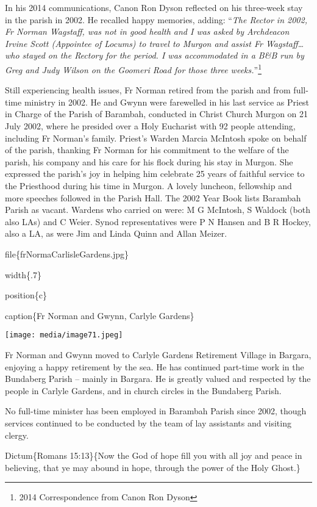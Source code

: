 In his 2014 communications, Canon Ron Dyson reflected on his three-week stay in the parish in 2002. He recalled happy memories, adding: ``\emph{The Rector in 2002, Fr Norman Wagstaff, was not in good health and I was asked by Archdeacon Irvine Scott (Appointee of Locums) to travel to Murgon and assist Fr Wagstaff\ldots who stayed on the Rectory for the period. I was accommodated in a B\&B run by Greg and Judy Wilson on the Goomeri Road for those three weeks.}''\footnote{2014 Correspondence from Canon Ron Dyson}

Still experiencing health issues, Fr Norman retired from the parish and from full-time ministry in 2002. He and Gwynn were farewelled in his last service as Priest in Charge of the Parish of Barambah, conducted in Christ Church Murgon on 21 July 2002, where he presided over a Holy Eucharist with 92 people attending, including Fr Norman's family. Priest's Warden Marcia McIntosh spoke on behalf of the parish, thanking Fr Norman for his commitment to the welfare of the parish, his company and his care for his flock during his stay in Murgon. She expressed the parish's joy in helping him celebrate 25 years of faithful service to the Priesthood during his time in Murgon. A lovely luncheon, fellowship and more speeches followed in the Parish Hall. The 2002 Year Book lists Barambah Parish as vacant. Wardens who carried on were: M G McIntosh, S Waldock (both also LAs) and C Weier. Synod representatives were P N Hansen and B R Hockey, also a LA, as were Jim and Linda Quinn and Allan Meizer.

file\{frNormaCarlisleGardens.jpg\}

width\{.7\}

position\{c\}

caption\{Fr Norman and Gwynn, Carlyle Gardens\}

\texttt{[image: media/image71.jpeg]}

Fr Norman and Gwynn moved to Carlyle Gardens Retirement Village in Bargara, enjoying a happy retirement by the sea. He has continued part-time work in the Bundaberg Parish -- mainly in Bargara. He is greatly valued and respected by the people in Carlyle Gardens, and in church circles in the Bundaberg Parish.

No full-time minister has been employed in Barambah Parish since 2002, though services continued to be conducted by the team of lay assistants and visiting clergy.

Dictum\{Romans 15:13\}\{Now the God of hope fill you with all joy and peace in believing, that ye may abound in hope, through the power of the Holy Ghost.\}

